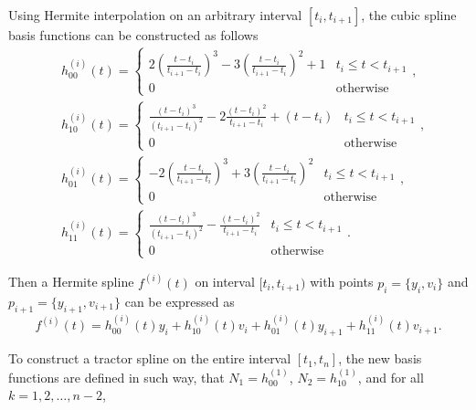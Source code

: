 Using Hermite interpolation on an arbitrary interval $[t_i,t_{i+1}]$, the cubic spline basis functions can be constructed as follows
\begin{align}\label{hermitebasis1}
&h_{00}^{(i)}(t)=
\begin{cases}
2(\frac{t-t_{i}}{t_{i+1}-t_{i}})^3-3(\frac{t-t_{i}}{t_{i+1}-t_{i}})^2+1 & t_i\leq t<t_{i+1} \\ 
0 & \mbox{otherwise}
\end{cases}, \\
&h_{10}^{(i)}(t)=\begin{cases}
\frac{(t-t_{i})^3}{(t_{i+1}-t_{i})^2}-2\frac{(t-t_{i})^2}{t_{i+1}-t_{i}}+(t-t_{i}) & t_i\leq t<t_{i+1} \\ 
0 &   \mbox{otherwise}
\end{cases},\\
&h_{01}^{(i)}(t)=
\begin{cases}
-2(\frac{t-t_i}{t_{i+1}-t_i})^3+3(\frac{t-t_i}{t_{i+1}-t_i})^2 & t_i\leq t<t_{i+1} \\ 
0 &   \mbox{otherwise}
\end{cases},\\
&h_{11}^{(i)}(t)=\begin{cases}
\frac{(t-t_i)^3}{(t_{i+1}-t_i)^2}-\frac{(t-t_i)^2}{t_{i+1}-t_i} & t_i\leq t<t_{i+1} \\ 
0 &   \mbox{otherwise}
\end{cases}.
\end{align}

Then a Hermite spline $f^{(i)}(t)$ on interval $[t_i,t_{i+1})$ with points $p_i=\{y_i,v_i\}$ and $p_{i+1}=\{y_{i+1},v_{i+1} \}$  can be expressed as
\begin{equation}
f^{(i)}(t)=h_{00}^{(i)}(t)y_i+h_{10}^{(i)}(t)v_i+h_{01}^{(i)}(t)y_{i+1}+h_{11}^{(i)}(t)v_{i+1}.
\end{equation}

To construct a tractor spline on the entire interval $[t_1,t_n]$, the new basis functions are defined in such way, that $N_1 = h^{(1)}_{00}$, $N_2 = h^{(1)}_{10}$, and for all $k=1,2,\ldots,n-2$, 

